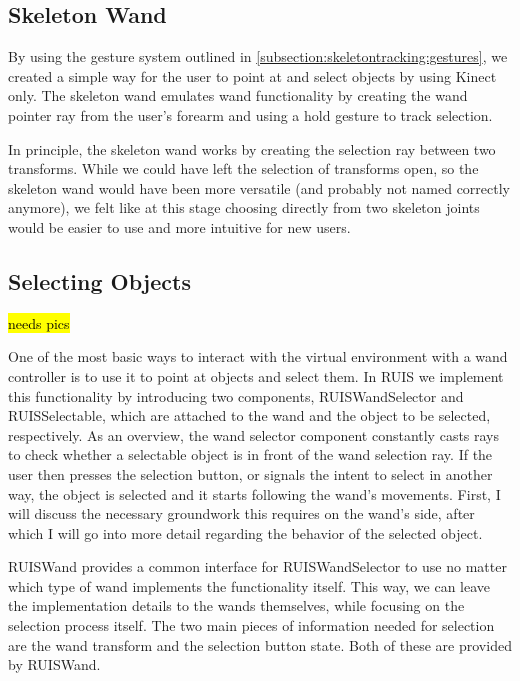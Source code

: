 \documentclass[12pt,a4paper,oneside,pdftex]{report}
\begin{document}
\subsection{Skeleton Wand}
\label{subsection:wandcontrollers:skeleton}

By using the gesture system outlined in \ref{subsection:skeletontracking:gestures}, we created a simple way for the user to point at and select objects by using Kinect only. The skeleton wand emulates wand functionality by creating the wand pointer ray from the user's forearm and using a hold gesture to track selection. 

In principle, the skeleton wand works by creating the selection ray between two transforms. While we could have left the selection of transforms open, so the skeleton wand would have been more versatile (and probably not named correctly anymore), we felt like at this stage choosing directly from two skeleton joints would be easier to use and more intuitive for new users.

\subsection{Selecting Objects}
\label{subsection:wandcontrollers:selection}

\hl{needs pics}

One of the most basic ways to interact with the virtual environment with a wand controller is to use it to point at objects and select them. In RUIS we implement this functionality by introducing two components, RUISWandSelector and RUISSelectable, which are attached to the wand and the object to be selected, respectively. As an overview, the wand selector component constantly casts rays to check whether a selectable object is in front of the wand selection ray. If the user then presses the selection button, or signals the intent to select in another way, the object is selected and it starts following the wand's movements. First, I will discuss the necessary groundwork this requires on the wand's side, after which I will go into more detail regarding the behavior of the selected object.

RUISWand provides a common interface for RUISWandSelector to use no matter which type of wand implements the functionality itself. This way, we can leave the implementation details to the wands themselves, while focusing on the selection process itself. The two main pieces of information needed for selection are the wand transform and the selection button state. Both of these are provided by RUISWand.
\end{document}
